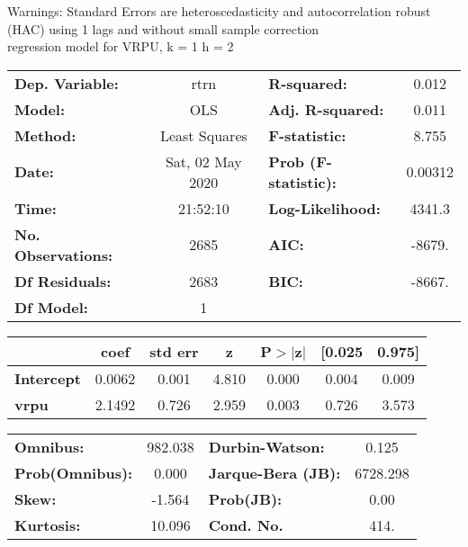 Warnings: \newline
 [1] Standard Errors are heteroscedasticity and autocorrelation robust (HAC) using 1 lags and without small sample correction\\ 

regression model for VRPU, k = 1 h = 2\begin{center}
\begin{tabular}{lclc}
\toprule
\textbf{Dep. Variable:}    &       rtrn       & \textbf{  R-squared:         } &     0.012   \\
\textbf{Model:}            &       OLS        & \textbf{  Adj. R-squared:    } &     0.011   \\
\textbf{Method:}           &  Least Squares   & \textbf{  F-statistic:       } &     8.755   \\
\textbf{Date:}             & Sat, 02 May 2020 & \textbf{  Prob (F-statistic):} &  0.00312    \\
\textbf{Time:}             &     21:52:10     & \textbf{  Log-Likelihood:    } &    4341.3   \\
\textbf{No. Observations:} &        2685      & \textbf{  AIC:               } &    -8679.   \\
\textbf{Df Residuals:}     &        2683      & \textbf{  BIC:               } &    -8667.   \\
\textbf{Df Model:}         &           1      & \textbf{                     } &             \\
\bottomrule
\end{tabular}
\begin{tabular}{lcccccc}
                   & \textbf{coef} & \textbf{std err} & \textbf{z} & \textbf{P$> |$z$|$} & \textbf{[0.025} & \textbf{0.975]}  \\
\midrule
\textbf{Intercept} &       0.0062  &        0.001     &     4.810  &         0.000        &        0.004    &        0.009     \\
\textbf{vrpu}      &       2.1492  &        0.726     &     2.959  &         0.003        &        0.726    &        3.573     \\
\bottomrule
\end{tabular}
\begin{tabular}{lclc}
\textbf{Omnibus:}       & 982.038 & \textbf{  Durbin-Watson:     } &    0.125  \\
\textbf{Prob(Omnibus):} &   0.000 & \textbf{  Jarque-Bera (JB):  } & 6728.298  \\
\textbf{Skew:}          &  -1.564 & \textbf{  Prob(JB):          } &     0.00  \\
\textbf{Kurtosis:}      &  10.096 & \textbf{  Cond. No.          } &     414.  \\
\bottomrule
\end{tabular}
\end{center}

